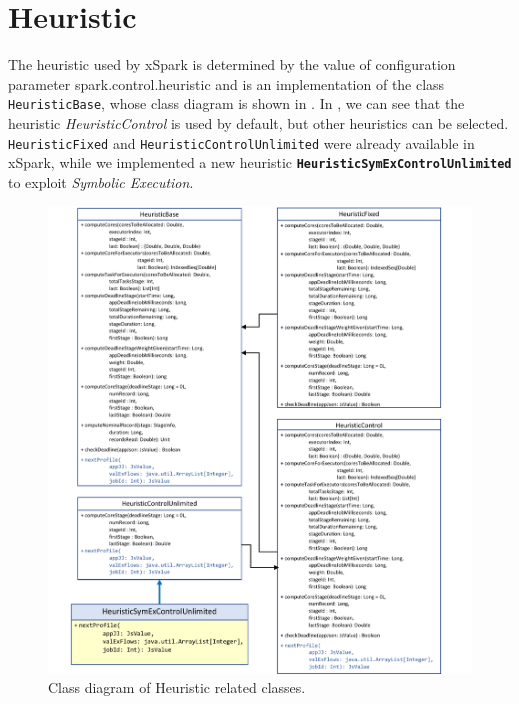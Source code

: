 \section{Heuristic}\label{sec:impl_heuristic}
The heuristic used by xSpark is determined by the value of configuration parameter spark.control.heuristic and is an implementation of the class \texttt{HeuristicBase}, whose class diagram is shown in . In  , we can see that the heuristic \textit{HeuristicControl} is used by default, but other heuristics can be selected. \texttt{HeuristicFixed} and \texttt{HeuristicControlUnlimited} were already available in xSpark, while we implemented a new heuristic  \textbf{\texttt{HeuristicSymExControlUnlimited}} to exploit \textit{Symbolic Execution}.

\begin{figure}[tbhp]
	\hspace*{-4cm}
	\centering
	\includegraphics[width=20cm]{images/heuristic_class_diagram}
	\caption{Class diagram of Heuristic related classes.}
	\label{fig:heuristic_class_diagram}
\end{figure}
